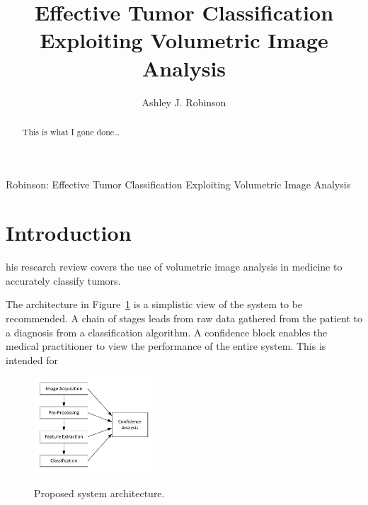 \documentclass[journal]{IEEEtran}
\begin{document}
\title{Effective Tumor Classification Exploiting Volumetric Image Analysis}
\author{Ashley J. Robinson}

%
{Robinson: Effective Tumor Classification Exploiting Volumetric Image Analysis}

\maketitle


\begin{abstract}

This is what I gone done\dots

\end{abstract}







\begin{IEEEkeywords}

\end{IEEEkeywords}



\IEEEpeerreviewmaketitle



\section{Introduction}
his research review covers the use of volumetric image analysis in medicine to accurately classify tumors.   

The architecture in Figure~\ref{fig:Proposed} is a simplistic view of the system to be recommended.
A chain of stages leads from raw data gathered from the patient to a diagnosis from a classification algorithm.
A confidence block enables the medical practitioner to view the performance of the entire system.
This is intended for
\begin{figure}[!htb]
   \centering
   \includegraphics[width = 0.4\textwidth]{Figures/Proposed.pdf}
   \label{fig:Proposed}
   \caption{Proposed system architecture.}
\end{figure}
\end{document}
